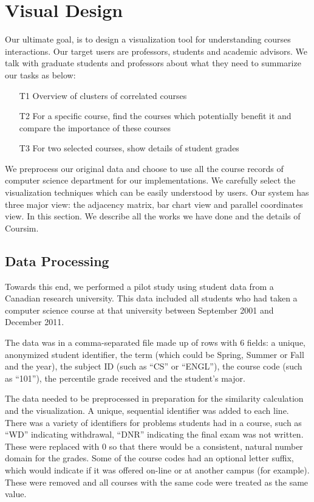 \section{Visual Design} %
\label{sec:vis}

Our ultimate goal, is to design a visualization tool for understanding courses interactions. Our target users are professors, students and academic advisors. We talk with graduate students and professors about what they need to summarize our tasks as below:
\begin{itemize}
	\item [T1] Overview of clusters of correlated courses
	\item [T2] For a specific course, find the courses which potentially benefit it and compare the importance of these courses
	\item [T3] For two selected courses, show details of student grades
\end{itemize}

We preprocess our original data and choose to use all the course records of computer science department for our implementations. We carefully select the visualization techniques which can be easily understood by users. Our system has three major view: the adjacency matrix, bar chart view and parallel coordinates view. In this section. We describe all the works we have done and the details of Coursim.%


\subsection{Data Processing}
\label{sec:data}
Towards this end, we performed a pilot study using student data from a Canadian research university.  This data included all students who had taken a computer science course at that university between September 2001 and December 2011.

The data was in a comma-separated file made up of rows with 6 fields:  a unique, anonymized student identifier, the term (which could be Spring, Summer or Fall and the year), the subject ID (such as “CS” or “ENGL”), the course code (such as “101”), the percentile grade received and the student’s major.

The data needed to be preprocessed in preparation for the similarity calculation and the visualization.  A unique, sequential identifier was added to each line.  There was a variety of identifiers for problems students had in a course, such as “WD” indicating withdrawal, “DNR” indicating the final exam was not written.  These were replaced with 0 so that there would be a consistent, natural number domain for the grades.  Some of the course codes had an optional letter suffix, which would indicate if it was offered on-line or at another campus (for example).  These were removed and all courses with the same code were treated as the same value.

